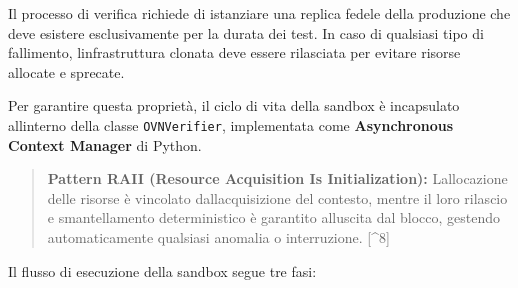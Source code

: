 Il processo di verifica richiede di istanziare una replica fedele della
produzione che deve esistere esclusivamente per la durata dei test. In
caso di qualsiasi tipo di fallimento, l\textquotesingle infrastruttura
clonata deve essere rilasciata per evitare risorse allocate e sprecate.

Per garantire questa proprietà, il ciclo di vita della sandbox è
incapsulato all\textquotesingle interno della classe
\passthrough{\lstinline!OVNVerifier!}, implementata come
\textbf{Asynchronous Context Manager} di Python.

\begin{quote}
\textbf{Pattern RAII (Resource Acquisition Is Initialization):}
L\textquotesingle allocazione delle risorse è vincolato
dall\textquotesingle acquisizione del contesto, mentre il loro rilascio
e smantellamento deterministico è garantito all\textquotesingle uscita
dal blocco, gestendo automaticamente qualsiasi anomalia o interruzione.
{[}\^{}8{]}
\end{quote}

Il flusso di esecuzione della sandbox segue tre fasi:


